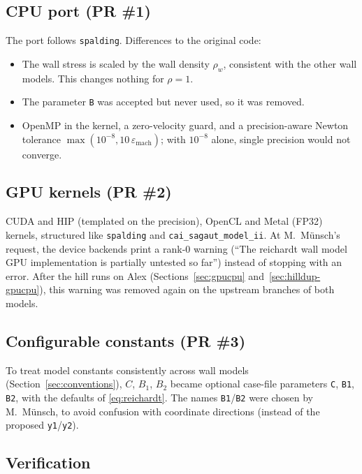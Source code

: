 \documentclass[11pt,a4paper]{article}
\newcommand{\code}[1]{\texttt{#1}}
\begin{document}
\subsection{CPU port (PR \#1)}

The port follows \code{spalding}. Differences to the original code:
\begin{itemize}
  \item The wall stress is scaled by the wall density $\rho_w$, consistent
    with the other wall models. This changes nothing for $\rho=1$.
  \item The parameter \code{B} was accepted but never used, so it was
    removed.
  \item OpenMP in the kernel, a zero-velocity guard, and a precision-aware
    Newton tolerance $\max(10^{-8}, 10\,\varepsilon_{\mathrm{mach}})$; with
    $10^{-8}$ alone, single precision would not converge.
\end{itemize}

\subsection{GPU kernels (PR \#2)}

CUDA and HIP (templated on the precision), OpenCL and Metal (FP32)
kernels, structured like \code{spalding} and \code{cai\_sagaut\_model\_ii}.
At M.~Münsch's request, the device backends print a rank-0 warning (``The
reichardt wall model GPU implementation is partially untested so far'')
instead of stopping with an error. After the hill runs on Alex
(Sections~\ref{sec:gpucpu} and~\ref{sec:hilldup-gpucpu}), this warning was
removed again on the upstream branches of both models.

\subsection{Configurable constants (PR \#3)}

To treat model constants consistently across wall models
(Section~\ref{sec:conventions}), $C$, $B_1$, $B_2$ became optional
case-file parameters \code{C}, \code{B1}, \code{B2}, with the defaults of
\eqref{eq:reichardt}. The names \code{B1}/\code{B2} were chosen by
M.~Münsch, to avoid confusion with coordinate directions (instead of the
proposed \code{y1}/\code{y2}).

\subsection{Verification}
\end{document}
